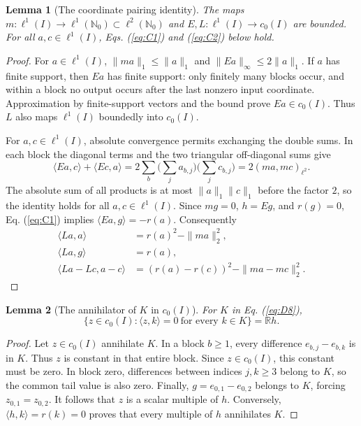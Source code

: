 \documentclass[11pt]{article}
\newcommand{\R}{\mathbb R}
\newcommand{\Nzero}{\mathbb N_0}
\newcommand{\pair}[2]{\langle #1,#2\rangle}
\newtheorem{lemma}{Lemma}
\theoremstyle{definition}
\theoremstyle{remark}
\begin{document}
\begin{lemma}[The coordinate pairing identity]
\label{lem:coordinate-pairing}
The maps $m:\ell^1(I)\to\ell^1(\Nzero)\subset\ell^2(\Nzero)$ and $E,L:\ell^1(I)\to c_0(I)$ are bounded. For all $a,c\in\ell^1(I)$, Eqs. (\ref{eq:C1}) and (\ref{eq:C2}) below hold.
\end{lemma}
\begin{proof}
\label{sec:C1}
For $a\in\ell^1(I)$, $\|ma\|_1\le\|a\|_1$ and $\|Ea\|_\infty\le2\|a\|_1$. If $a$ has finite support, then $Ea$ has finite support: only finitely many blocks occur, and within a block no output occurs after the last nonzero input coordinate. Approximation by finite-support vectors and the bound prove $Ea\in c_0(I)$. Thus $L$ also maps $\ell^1(I)$ boundedly into $c_0(I)$.

For $a,c\in\ell^1(I)$, absolute convergence permits exchanging the double sums. In each block the diagonal terms and the two triangular off-diagonal sums give
\begin{equation}
\pair{Ea}{c}+\pair{Ec}{a}
 =2\sum_b\Big(\sum_j a_{b,j}\Big)\Big(\sum_j c_{b,j}\Big)
 =2(ma,mc)_{\ell^2}.
\label{eq:C1}
\end{equation}
The absolute sum of all products is at most $\|a\|_1\|c\|_1$ before the factor $2$, so the identity holds for all $a,c\in\ell^1(I)$. Since $mg=0$, $h=Eg$, and $r(g)=0$, Eq. (\ref{eq:C1}) implies $\pair{Ea}{g}=-r(a)$. Consequently
\begin{equation}
\begin{aligned}
\pair{La}{a}&=r(a)^2-\|ma\|_2^2,\\
\pair{La}{g}&=r(a),\\
\pair{La-Lc}{a-c}&=(r(a)-r(c))^2-\|ma-mc\|_2^2.
\end{aligned}
\label{eq:C2}
\end{equation}
\end{proof}

\begin{lemma}[The annihilator of $K$ in $c_0(I)$]
\label{lem:coordinate-annihilator}
For $K$ in Eq. (\ref{eq:D8}),
\[
\{z\in c_0(I):\pair{z}{k}=0\ \text{for every }k\in K\}=\R h.
\]
\end{lemma}
\begin{proof}
Let $z\in c_0(I)$ annihilate $K$. In a block $b\ge1$, every difference $e_{b,j}-e_{b,k}$ is in $K$. Thus $z$ is constant in that entire block. Since $z\in c_0(I)$, this constant must be zero. In block zero, differences between indices $j,k\ge3$ belong to $K$, so the common tail value is also zero. Finally, $g=e_{0,1}-e_{0,2}$ belongs to $K$, forcing $z_{0,1}=z_{0,2}$. It follows that $z$ is a scalar multiple of $h$. Conversely, $\pair{h}{k}=r(k)=0$ proves that every multiple of $h$ annihilates $K$.
\end{proof}
\end{document}
